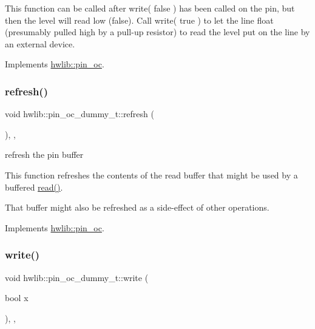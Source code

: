 This function can be called after write( false ) has been called on the pin, but then the level will read low (false). Call write( true ) to let the line float (presumably pulled high by a pull-\/up resistor) to read the level put on the line by an external device. 

Implements \hyperlink{classhwlib_1_1pin__oc_a51180afd605add59b96105fa98e29f88}{hwlib\+::pin\+\_\+oc}.

\mbox{\label{classhwlib_1_1pin__oc__dummy__t_a3609bb12b15736b0ad6d734c1d45ae49}} 
\subsubsection{\texorpdfstring{refresh()}{refresh()}}
{\footnotesize\ttfamily void hwlib\+::pin\+\_\+oc\+\_\+dummy\+\_\+t\+::refresh (\begin{DoxyParamCaption}{ }\end{DoxyParamCaption})\hspace{0.3cm}{\ttfamily [inline]}, {\ttfamily [override]}, {\ttfamily [virtual]}}





refresh the pin buffer

This function refreshes the contents of the read buffer that might be used by a buffered \hyperlink{classhwlib_1_1pin__oc__dummy__t_a53c06f28f7885d1bed4d29cb15aa4b33}{read()}.

That buffer might also be refreshed as a side-\/effect of other operations. 

Implements \hyperlink{classhwlib_1_1pin__oc_a573740f6f790c5792efc9cdd44cc73b3}{hwlib\+::pin\+\_\+oc}.

\mbox{\label{classhwlib_1_1pin__oc__dummy__t_a85fd03ccea573743545a33c131d2674d}} 
\subsubsection{\texorpdfstring{write()}{write()}}
{\footnotesize\ttfamily void hwlib\+::pin\+\_\+oc\+\_\+dummy\+\_\+t\+::write (\begin{DoxyParamCaption}\item[{bool}]{x }\end{DoxyParamCaption})\hspace{0.3cm}{\ttfamily [inline]}, {\ttfamily [override]}, {\ttfamily [virtual]}}





